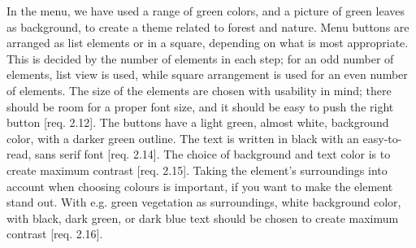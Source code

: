 In the menu, we have used a range of green colors, and a picture of green leaves as background, to create a theme related to forest and nature. Menu buttons are arranged as list elements or in a square, depending on what is most appropriate. This is decided by the number of elements in each step; for an odd number of elements, list view is used, while square arrangement is used for an even number of elements. The size of the elements are chosen with usability in mind; there should be room for a proper font size, and it should be easy to push the right button [req. 2.12]. The buttons have a light green, almost white, background color, with a darker green outline. The text is written in black with an easy-to-read, sans serif font [req. 2.14]. The choice of background and text color is to create maximum contrast [req. 2.15]. Taking the element's surroundings into account when choosing colours is important, if you want to make the element stand out. With e.g. green vegetation as surroundings, white background color, with black, dark green, or dark blue text should be chosen to create maximum contrast [req. 2.16]. 


